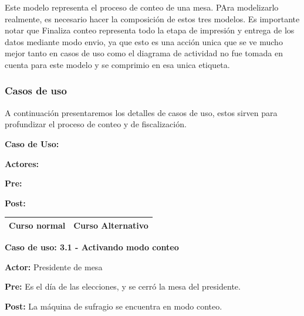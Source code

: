 \begin{figure}[h!]
\centering
\end{figure}			

Este modelo representa el proceso de conteo de una mesa. PAra modelizarlo realmente, es necesario hacer la composición de estos tres modelos. Es importante notar que Finaliza conteo representa todo la etapa de impresión y entrega de los datos mediante modo envio, ya que esto es una acción unica que se ve mucho mejor tanto en casos de uso como el diagrama de actividad no fue tomada en cuenta para este modelo y se comprimio en esa unica etiqueta.

\subsubsection{Casos de uso}

\begin{figure}[h!]
\centering
\end{figure}			

A continuación presentaremos los detalles de casos de uso, estos sirven para profundizar el proceso de conteo y de fiscalización.

\textbf{Caso de Uso: }

\textbf{Actores:} 

\textbf{Pre:} 

\textbf{Post:}
\begin{table}[h!]
	
 \begin{tabular}{|p{7.5cm} | p{7.5cm}|} 
 \hline
 \textbf{Curso normal} & \textbf{Curso Alternativo} \\
 \hline

 \end{tabular}

\end{table}



\textbf{Caso de uso: 3.1 - Activando modo conteo}

\textbf{Actor:} Presidente de mesa

\textbf{Pre:} Es el día de las elecciones, y se cerró la mesa del presidente.

\textbf{Post:} La máquina de sufragio se encuentra en modo conteo.


